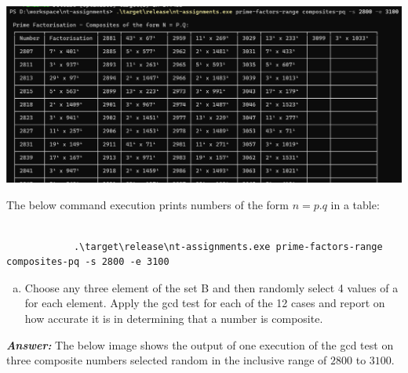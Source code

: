 \documentclass[11pt,a4paper]{article}
\begin{document}
\begin{enumerate}[1.]
\begin{flushleft}
		
			\begin{minipage}{\linewidth}
				\begin{center}
					\includegraphics[scale=.45]{n_is_p.q.png}
				\end{center}
			\end{minipage}
			
			\bigbreak
			The below command execution prints numbers of the form $n = p.q$ in a table:
			\begin{lstlisting}[style=DOS, caption=Print numbers of the form n = p.q]
				
			.\target\release\nt-assignments.exe prime-factors-range composites-pq -s 2800 -e 3100
			\end{lstlisting}

		\end{flushleft}
		
		\begin{enumerate}[(c)]
			\item Choose any three element of the set B and then randomly select 4 values of a for each element. Apply the gcd test for each of the 12 cases and report on how accurate it is in determining that a number is composite.  
		\end{enumerate}
		\begin{flushleft}
			\textbf{\textit{Answer:}} The below image shows the output of one execution of the gcd test on three composite numbers selected random in the inclusive range of $2800$ to $3100$.
			

\end{flushleft}
\end{enumerate}
\end{document}
